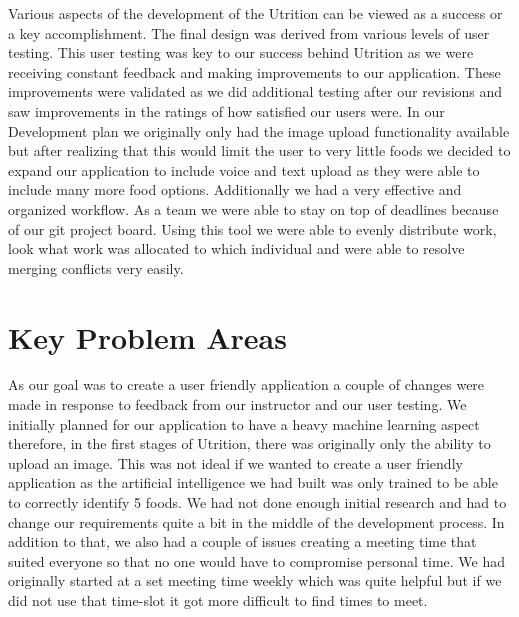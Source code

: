 \documentclass{article}
\begin{document}

Various aspects of the development of the Utrition can be viewed as a success or a key accomplishment. The final design was derived from various levels of user testing. This user testing was key to our success behind Utrition as we were receiving constant feedback and making improvements to our application. These improvements were validated as we did additional testing after our revisions and saw improvements in the ratings of how satisfied our users were. In our Development plan we originally only had the image upload functionality available but after realizing that this would limit the user to very little foods we decided to expand our application to include voice and text upload as they were able to include many more food options. Additionally we had a very effective and organized workflow. As a team we were able to stay on top of deadlines because of our git project board. Using this tool we were able to evenly distribute work, look what work was allocated to which individual and were able to resolve merging conflicts very easily. 
\section{Key Problem Areas}


  As our goal was to create a user friendly application a couple of changes were made in response to feedback from our instructor and our user testing. We initially planned for our application to have a heavy machine learning aspect therefore, in the first stages of Utrition, there was originally only the ability to upload an image. This was not ideal if we wanted to create a user friendly application as the artificial intelligence we had built was only trained to be able to correctly identify 5 foods. We had not done enough initial research and had to change our requirements quite a bit in the middle of the development process. In addition to that, we also had a couple of issues creating a meeting time that suited everyone so that no one would have to compromise personal time. We had originally started at a set meeting time weekly which was quite helpful but if we did not use that time-slot it got more difficult to find times to meet. 
\end{document}
